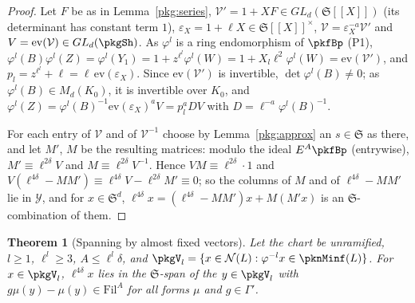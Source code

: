 \documentclass[10pt]{amsart}
\newtheorem{theorem}{Theorem}[section]
\theoremstyle{definition}
\theoremstyle{remark}
\begin{document}
\begin{proof}
Let $F$ be as in Lemma~\ref{pkg:series}, $\mathcal V'=1+XF\in GL_d(\mathfrak S[[X]])$ (its determinant has
constant term $1$), $\varepsilon_X=1+\ell X\in\mathfrak S[[X]]^\times$, $\mathcal V=\varepsilon_X^{-a}\mathcal V'$ and
$V=\mathrm{ev}(\mathcal V)\in GL_d(\pkgSh)$. As $\varphi^l$ is a ring endomorphism of $\pkfBp$ (P1),
$\varphi^l(B)\varphi^l(Z)=\varphi^l(Y_1)=1+z^{\ell^l}\varphi^l(W)=1+X_l\ell^2\varphi^l(W)=\mathrm{ev}(\mathcal V')$, and
$p_l=z^{\ell^l}+\ell=\ell\,\mathrm{ev}(\varepsilon_X)$. Since $\mathrm{ev}(\mathcal V')$ is invertible,
$\det\varphi^l(B)\ne0$; as $\varphi^l(B)\in M_d(K_0)$, it is invertible over $K_0$, and
$\varphi^l(Z)=\varphi^l(B)^{-1}\mathrm{ev}(\varepsilon_X)^aV=p_l^aDV$ with $D=\ell^{-a}\varphi^l(B)^{-1}$.

For each entry of $\mathcal V$ and of $\mathcal V^{-1}$ choose by Lemma~\ref{pkg:approx} an $s\in\mathfrak S$ as
there, and let $M'$, $M$ be the resulting matrices: modulo the ideal $E^A\pkfBp$ (entrywise),
$M'\equiv\ell^{2\delta}V$ and $M\equiv\ell^{2\delta}V^{-1}$. Hence $VM\equiv\ell^{2\delta}\cdot1$ and
$V(\ell^{4\delta}-MM')\equiv\ell^{4\delta}V-\ell^{2\delta}M'\equiv0$; so the columns of $M$ and of
$\ell^{4\delta}-MM'$ lie in $\mathcal Y$, and for $x\in\mathfrak S^d$,
$\ell^{4\delta}x=(\ell^{4\delta}-MM')x+M(M'x)$ is an $\mathfrak S$-combination of them.
\end{proof}

\begin{theorem}[Spanning by almost fixed vectors]\label{pkg:span}
Let the chart be unramified, $l\ge1$, $\ell^l\ge3$, $A\le\ell^l\delta$, and
$\pkgV_l=\{x\in\mathcal N(L):\varphi^{-l}x\in\pknMinf(L)\}$. For $x\in\pkgV_l$, $\ell^{4\delta}x$ lies in the
$\mathfrak S$-span of the $y\in\pkgV_l$ with $g\mu(y)-\mu(y)\in\mathrm{Fil}^A$ for all forms $\mu$ and
$g\in\Gamma'$.
\end{theorem}
\end{document}
